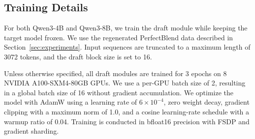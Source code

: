\subsection{Training Details}
\label{app:training_details}

For both Qwen3-4B and Qwen3-8B, we train the \method draft module while keeping the target model frozen. We use the regenerated PerfectBlend data described in Section~\ref{sec:experiments}. Input sequences are truncated to a maximum length of 3072 tokens, and the draft block size is set to 16.

Unless otherwise specified, all draft modules are trained for 3 epochs on 8 NVIDIA A100-SXM4-80GB GPUs. We use a per-GPU batch size of 2, resulting in a global batch size of 16 without gradient accumulation. We optimize the model with AdamW using a learning rate of \(6\times 10^{-4}\), zero weight decay, gradient clipping with a maximum norm of 1.0, and a cosine learning-rate schedule with a warmup ratio of 0.04. Training is conducted in bfloat16 precision with FSDP and gradient sharding.

\begin{table}[H]
\centering
\caption{Baseline draft model checkpoints used in our experiments.}
\label{tab:baseline_checkpoints}
\end{table}

